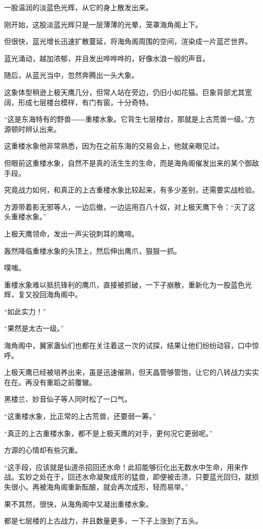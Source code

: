 \begin{this_body}
一股温润的淡蓝色光辉，从它的身上散发出来。

刚开始，这股淡蓝光辉只是一层薄薄的光晕，笼罩海角阁上下。

但很快，蓝光增长迅速扩散蔓延，将海角阁周围的空间，渲染成一片蓝芒世界。

蓝光涌动，越加浓郁，并且发出哗哗哗的，好像水浪一般的声音。

随后，从蓝光当中，忽然奔腾出一头大象。

这象体型稍逊上极天鹰几分，但常人站在旁边，仍旧小如花猫。巨象背部尤其宽阔，形成七层楼台模样，有门有窗，十分奇特。

“这是东海特有的野兽――重楼水象。它背生七层楼台，那就是上古荒兽一级。”方源顿时辨认出来。

这重楼水象他非常熟悉，因为在之前东海的交易会上，他就亲眼见过。

但眼前这重楼水象，自然不是真的活生生的生命，而是海角阁催发出来的某个御敌手段。

究竟战力如何，和真正的上古重楼水象比较起来，有多少差别，还需要实战检验。

方源带着影无邪等人，一边后撤，一边运用百八十奴，对上极天鹰下令：“灭了这头重楼水象。”

上极天鹰领命，发出一声尖锐刺耳的鹰啼。

轰然降临重楼水象的头顶上，然后伸出鹰爪，狠狠一抓。

噗嗤。

重楼水象难以抵抗锋利的鹰爪，直接被抓破，一下子崩散，重新化为一股蓝色光辉，复又投回海角阁中。

“如此实力！”

“果然是太古一级。”

海角阁中，翼家蛊仙们也都在关注着这一次的试探，结果让他们纷纷动容，口中惊呼。

上极天鹰已经被培养出来，虽是迅速催熟，但天晶管够管饱，让它的八转战力实实在在。再没有重蹈之前覆辙。

黑楼兰、妙音仙子等人同时松了一口气。

“这重楼水象，比正常的上古荒兽，还要弱一筹。”

“真正的上古重楼水象，都不是上极天鹰的对手，更何况它更弱呢。”

方源的心情却有些沉重。

“这手段，应该就是仙道杀招回还水命！此招能够衍化出无数水中生命，用来作战。玄妙之处在于，回还水命凝聚成形的猛兽，即便被击溃，只要蓝光回归，就损失很小。再被海角阁重新酝酿，就会再次成形，轻而易举。”

果不其然，很快，从海角阁中又凝出重楼水象。

都是七层楼的上古战力，并且数量更多，一下子上涨到了五头。


\end{this_body}

